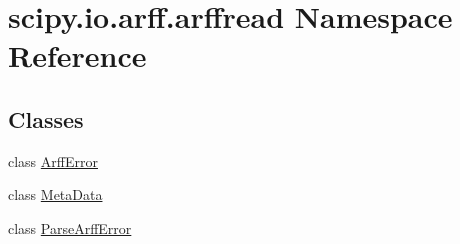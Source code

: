 \hypertarget{namespacescipy_1_1io_1_1arff_1_1arffread}{}\section{scipy.\+io.\+arff.\+arffread Namespace Reference}
\label{namespacescipy_1_1io_1_1arff_1_1arffread}
\subsection*{Classes}
\begin{DoxyCompactItemize}
\item 
class \hyperlink{classscipy_1_1io_1_1arff_1_1arffread_1_1ArffError}{Arff\+Error}
\item 
class \hyperlink{classscipy_1_1io_1_1arff_1_1arffread_1_1MetaData}{Meta\+Data}
\item 
class \hyperlink{classscipy_1_1io_1_1arff_1_1arffread_1_1ParseArffError}{Parse\+Arff\+Error}
\end{DoxyCompactItemize}
